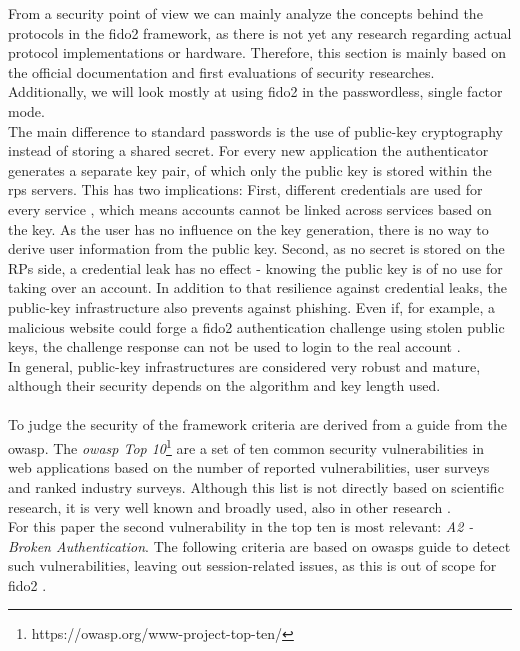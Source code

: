 From a security point of view we can mainly analyze the concepts behind the protocols in the \ac{fido2} framework, as there is not yet any research regarding actual protocol implementations or hardware. Therefore, this section is mainly based on the official documentation and first evaluations of security researches. Additionally, we will look mostly at using \ac{fido2} in the passwordless, single factor mode.\\
The main difference to standard passwords is the use of public-key cryptography instead of storing a shared secret. For every new application the authenticator generates a separate key pair, of which only the public key is stored within the \acp{rp} servers. This has two implications: First, different credentials are used for every service \cite{mdn_webauthn,webauthn_standard}, which means accounts cannot be linked across services based on the key. As the user has no influence on the key generation, there is no way to derive user information from the public key. Second, as no secret is stored on the RPs side, a credential leak has no effect - knowing the public key is of no use for taking over an account. In addition to that resilience against credential leaks, the public-key infrastructure also prevents against phishing. Even if, for example, a malicious website could forge a \ac{fido2} authentication challenge using stolen public keys, the challenge response can not be used to login to the real account \cite{fido2_webauthn,fido2_overview}.\\
In general, public-key infrastructures are considered very robust and mature, although their security depends on the algorithm and key length used.\\
\\
To judge the security of the framework criteria are derived from a guide from the \ac{owasp}. The \emph{\ac{owasp} Top 10}\footnote{https://owasp.org/www-project-top-ten/} are a set of ten common security vulnerabilities in web applications based on the number of reported vulnerabilities, user surveys and ranked industry surveys. Although this list is not directly based on scientific research, it is very well known and broadly used, also in other research \cite{rafique2015}.\\
For this paper the second vulnerability in the top ten is most relevant: \emph{A2 - Broken Authentication}. The following criteria are based on \acp{owasp} guide to detect such vulnerabilities, leaving out session-related issues, as this is out of scope for \ac{fido2} \cite{owasp_auth}.

